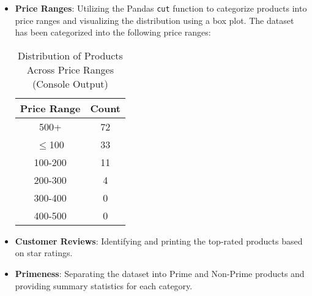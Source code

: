 {	\begin{itemize}
	    \item \textbf{Price Ranges}: Utilizing the Pandas \texttt{cut} function to categorize products into price ranges and visualizing the distribution using a box plot.
	    The dataset has been categorized into the following price ranges:
	    
	    \begin{table}[h]
	        \centering
	        \begin{tabular}{|c|c|}
	            \hline
	            \textbf{Price Range} & \textbf{Count} \\
	            \hline
	            500+ & 72 \\
	            $\le$100 & 33 \\
	            100-200 & 11 \\
	            200-300 & 4 \\
	            300-400 & 0 \\
	            400-500 & 0 \\
	            \hline
	        \end{tabular}
	        \caption{Distribution of Products Across Price Ranges (Console Output)}
	        \label{tab:price_ranges}
	    \end{table}
	    

	    \item \textbf{Customer Reviews}: Identifying and printing the top-rated products based on star ratings.
	    

	    \item \textbf{Primeness}: Separating the dataset into Prime and Non-Prime products and providing summary statistics for each category.
	    

\end{itemize}}
